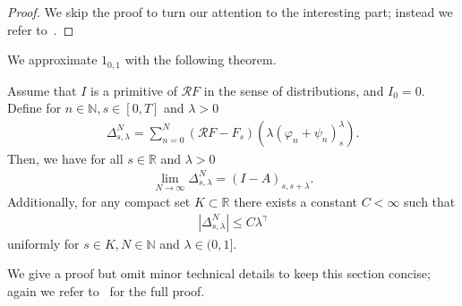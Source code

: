 \begin{proof}
  We skip the proof to turn our attention to the interesting part; instead we refer to~\cite[Lemma 5.2]{broux2021sewing}.
\end{proof}

We approximate \( 1_{0,1} \) with the following theorem.

\begin{theorem}
  Assume that \( I \) is a primitive of \( \mathcal{R}F \) in the sense of distributions, and \( I_0 = 0 \). Define for \( n \in \mathbb{N}, s \in [0,T] \) and \( \lambda > 0 \)
  \begin{align*}
    \Delta^N_{s, \lambda} = \sum^N_{n=0}(\mathcal{R}F - F_s)(\lambda(\varphi_n + \psi_n)^\lambda_s) .
  \end{align*}
  Then, we have for all \( s \in \mathbb{R} \) and \( \lambda > 0 \)
  \begin{align*}
    \lim_{N \to \infty} \Delta^N_{s, \lambda} = (I - A)_{s, s + \lambda}.
  \end{align*}
  Additionally, for any compact set \( K \subset \mathbb{R} \) there exists a constant \( C < \infty \) such that 
  \begin{align*}
    |\Delta^N_{s, \lambda}| \leq C \lambda^\gamma
  \end{align*}
  uniformly for \( s \in K, N \in \mathbb{N} \) and \( \lambda \in(0,1] \).
\end{theorem}

We give a proof but omit minor technical details to keep this section concise; again we refer to~\cite{broux2021sewing} for the full proof. 

